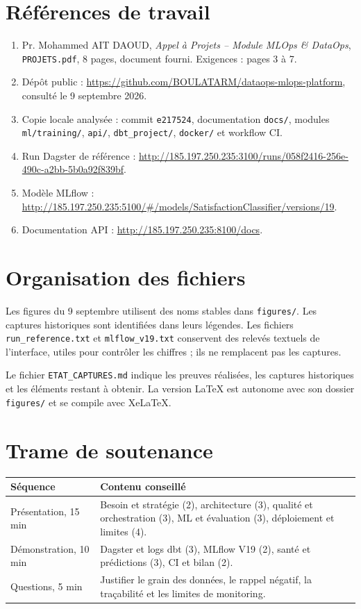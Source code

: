 \documentclass[11pt,a4paper]{report}
\newcommand{\code}[1]{\nolinkurl{#1}}
\begin{document}
\section{Références de travail}
\begin{enumerate}[leftmargin=*]
\item Pr. Mohammed AIT DAOUD, \emph{Appel à Projets -- Module MLOps \& DataOps}, \code{PROJETS.pdf}, 8 pages, document fourni. Exigences : pages 3 à 7.
\item Dépôt public : \url{https://github.com/BOULATARM/dataops-mlops-platform}, consulté le 9 septembre 2026.
\item Copie locale analysée : commit \code{e217524}, documentation \code{docs/}, modules \code{ml/training/}, \code{api/}, \code{dbt_project/}, \code{docker/} et workflow CI.
\item Run Dagster de référence : \url{http://185.197.250.235:3100/runs/058f2416-256e-490c-a2bb-5b0a92f839bf}.
\item Modèle MLflow : \url{http://185.197.250.235:5100/#/models/SatisfactionClassifier/versions/19}.
\item Documentation API : \url{http://185.197.250.235:8100/docs}.
\end{enumerate}
\section{Organisation des fichiers}
Les figures du 9 septembre utilisent des noms stables dans \code{figures/}. Les captures historiques sont identifiées dans leurs légendes. Les fichiers \code{run_reference.txt} et \code{mlflow_v19.txt} conservent des relevés textuels de l'interface, utiles pour contrôler les chiffres ; ils ne remplacent pas les captures.

Le fichier \code{ETAT_CAPTURES.md} indique les preuves réalisées, les captures historiques et les éléments restant à obtenir. La version LaTeX est autonome avec son dossier \code{figures/} et se compile avec XeLaTeX.

\section{Trame de soutenance}
\par\noindent\begin{tabularx}{\linewidth}{p{3.2cm}Y}\toprule
\textbf{Séquence} & \textbf{Contenu conseillé}\\\midrule
Présentation, 15 min & Besoin et stratégie (2), architecture (3), qualité et orchestration (3), ML et évaluation (3), déploiement et limites (4).\\
Démonstration, 10 min & Dagster et logs dbt (3), MLflow V19 (2), santé et prédictions (3), CI et bilan (2).\\
Questions, 5 min & Justifier le grain des données, le rappel négatif, la traçabilité et les limites de monitoring.\\\bottomrule
\end{tabularx}
\end{document}
